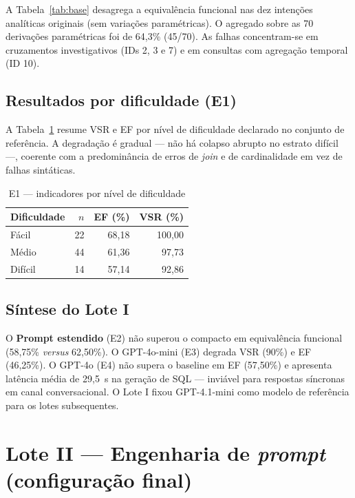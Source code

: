 A Tabela~\ref{tab:base} desagrega a equivalência funcional nas dez intenções analíticas originais (sem variações paramétricas). O agregado sobre as 70 derivações paramétricas foi de 64,3\% (45/70). As falhas concentram-se em cruzamentos investigativos (IDs 2, 3 e 7) e em consultas com agregação temporal (ID 10).

\subsection{Resultados por dificuldade (E1)}

A Tabela~\ref{tab:diff} resume VSR e EF por nível de dificuldade declarado no conjunto de referência. A degradação é gradual --- não há colapso abrupto no estrato difícil ---, coerente com a predominância de erros de \textit{join} e de cardinalidade em vez de falhas sintáticas.

\begin{table}[H]
\centering
\caption{E1 --- indicadores por nível de dificuldade}
\label{tab:diff}
\begin{tabular}{lrrr}
\toprule
\textbf{Dificuldade} & \textbf{$n$} & \textbf{EF (\%)} & \textbf{VSR (\%)} \\
\midrule
Fácil & 22 & 68,18 & 100,00 \\
Médio & 44 & 61,36 & 97,73 \\
Difícil & 14 & 57,14 & 92,86 \\
\bottomrule
\end{tabular}
\end{table}

\subsection{Síntese do Lote I}

O \textbf{Prompt estendido} (E2) não superou o compacto em equivalência funcional (58,75\% \textit{versus} 62,50\%). O GPT-4o-mini (E3) degrada VSR (90\%) e EF (46,25\%). O GPT-4o (E4) não supera o baseline em EF (57,50\%) e apresenta latência média de 29,5~s na geração de SQL --- inviável para respostas síncronas em canal conversacional. O Lote I fixou GPT-4.1-mini como modelo de referência para os lotes subsequentes.

\section{Lote II --- Engenharia de \textit{prompt} (configuração final)}

